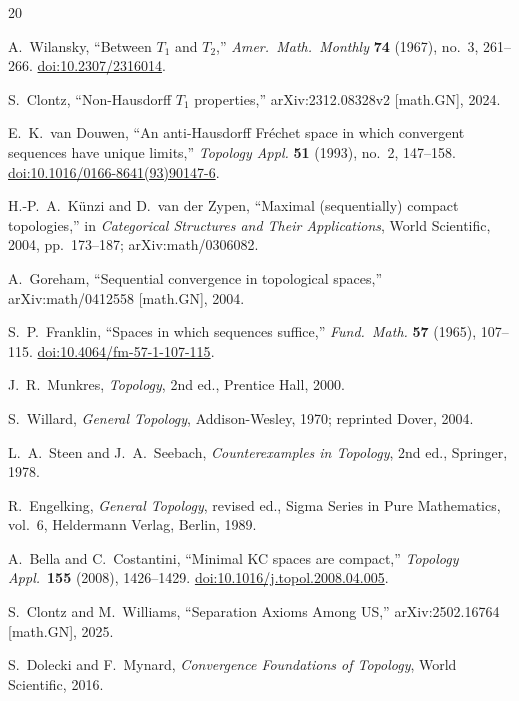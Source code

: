 \documentclass[11pt]{article}
\theoremstyle{definition}
\theoremstyle{remark}
\begin{document}
\begin{thebibliography}{20}

A.~Wilansky,
``Between $T_1$ and $T_2$,''
\textit{Amer.\ Math.\ Monthly} \textbf{74} (1967), no.~3, 261--266.
\href{https://doi.org/10.2307/2316014}{doi:10.2307/2316014}.

S.~Clontz,
``Non-Hausdorff $T_1$ properties,''
arXiv:2312.08328v2 [math.GN], 2024.

E.~K.~van Douwen,
``An anti-Hausdorff Fr\'{e}chet space in which convergent sequences have
unique limits,''
\textit{Topology Appl.} \textbf{51} (1993), no.~2, 147--158.
\href{https://doi.org/10.1016/0166-8641(93)90147-6}{doi:10.1016/0166-8641(93)90147-6}.

H.-P.~A.~K\"{u}nzi and D.~van der Zypen,
``Maximal (sequentially) compact topologies,''
in \textit{Categorical Structures and Their Applications},
World Scientific, 2004, pp.~173--187; arXiv:math/0306082.

A.~Goreham,
``Sequential convergence in topological spaces,''
arXiv:math/0412558 [math.GN], 2004.

S.~P.~Franklin,
``Spaces in which sequences suffice,''
\textit{Fund.\ Math.} \textbf{57} (1965), 107--115.
\href{https://doi.org/10.4064/fm-57-1-107-115}{doi:10.4064/fm-57-1-107-115}.

J.~R.~Munkres,
\textit{Topology}, 2nd ed., Prentice Hall, 2000.

S.~Willard,
\textit{General Topology}, Addison-Wesley, 1970; reprinted Dover, 2004.

L.~A.~Steen and J.~A.~Seebach,
\textit{Counterexamples in Topology}, 2nd ed., Springer, 1978.

R.~Engelking,
\textit{General Topology}, revised ed.,
Sigma Series in Pure Mathematics, vol.~6,
Heldermann Verlag, Berlin, 1989.

A.~Bella and C.~Costantini,
``Minimal KC spaces are compact,''
\textit{Topology Appl.}\ \textbf{155} (2008), 1426--1429.
\href{https://doi.org/10.1016/j.topol.2008.04.005}{doi:10.1016/j.topol.2008.04.005}.

S.~Clontz and M.~Williams,
``Separation Axioms Among US,''
arXiv:2502.16764 [math.GN], 2025.

S.~Dolecki and F.~Mynard,
\emph{Convergence Foundations of Topology},
World Scientific, 2016.


\end{thebibliography}
\end{document}
